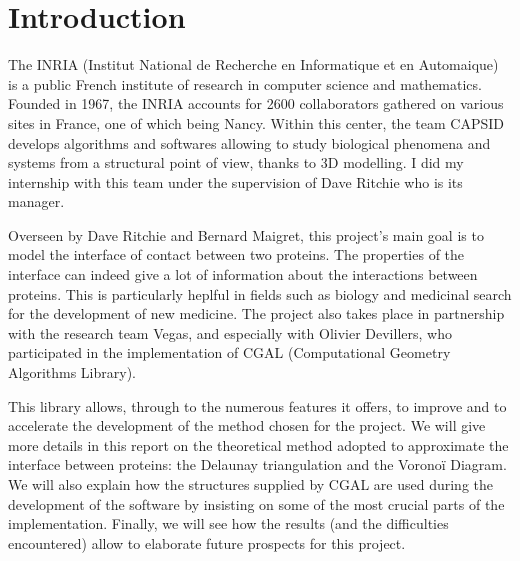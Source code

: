 \chapter*{Introduction}

The INRIA (Institut National de Recherche en Informatique et en Automaique)
is a public French
institute of research in computer science and mathematics.
Founded in 1967, the INRIA
accounts for 2600 collaborators gathered on various sites in
France, one of which being Nancy. Within this center, the team CAPSID develops
algorithms and softwares allowing to study biological phenomena and systems
from a structural point of view, thanks to 3D modelling. I did my internship
with this team under the supervision of Dave Ritchie who is its manager.

Overseen by Dave Ritchie and Bernard Maigret, this project's main goal is to
model the interface of contact between two proteins. The properties of the interface
can indeed give a lot of information about the interactions between
proteins. This is particularly heplful in fields such as biology and medicinal search for
the development of new medicine.
The project also takes place in partnership with the research team Vegas, and
especially with Olivier Devillers, who participated in the implementation of CGAL
(Computational Geometry Algorithms Library).

This library allows, through to the numerous features it offers,
to improve and to accelerate the development of the method chosen for the project.
We will give more details in this report on the theoretical method adopted
to approximate the interface between proteins: the Delaunay triangulation and the
Voronoï Diagram. We will also explain how the structures supplied by CGAL are used during the
development of the software by insisting on some of the most crucial parts
of the implementation.
Finally, we will see how the results (and the difficulties encountered)
allow to elaborate future prospects for this project.

